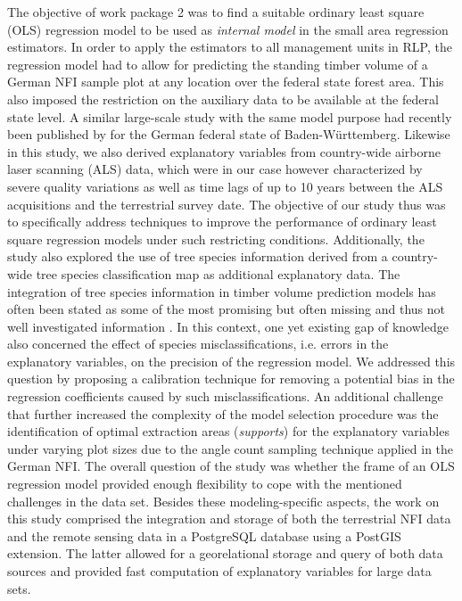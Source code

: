 The objective of work package 2 was to find a suitable ordinary least square (OLS) regression model to be used as \textit{internal model} in the small area regression estimators. In order to apply the estimators to all management units in RLP, the regression model had to allow for predicting the standing timber volume of a German NFI sample plot at any location over the federal state forest area. This also imposed the restriction on the auxiliary data to be available at the federal state level. A similar large-scale study with the same model purpose had recently been published by \citet{maack2016} for the German federal state of Baden-W{\"u}rttemberg. Likewise in this study, we also derived explanatory variables from country-wide airborne laser scanning (ALS) data, which were in our case however characterized by severe quality variations as well as time lags of up to 10 years between the ALS acquisitions and the terrestrial survey date. The objective of our study thus was to specifically address techniques to improve the performance of ordinary least square regression models under such restricting conditions. Additionally, the study also explored the use of tree species information derived from a country-wide tree species classification map as additional explanatory data. The integration of tree species information in timber volume prediction models has often been stated as some of the most promising but often missing and thus not well investigated information \citep{koch2010, white2016}. In this context, one yet existing gap of knowledge also concerned the effect of species misclassifications, i.e. errors in the explanatory variables, on the precision of the regression model. We addressed this question by proposing a calibration technique for removing a potential bias in the regression coefficients caused by such misclassifications. An additional challenge that further increased the complexity of the model selection procedure was the identification of optimal extraction areas (\textit{supports}) for the explanatory variables under varying plot sizes due to the angle count sampling technique applied in the German NFI. The overall question of the study was whether the frame of an OLS regression model provided enough flexibility to cope with the mentioned challenges in the data set. Besides these modeling-specific aspects, the work on this study comprised the integration and storage of both the terrestrial NFI data and the remote sensing data in a PostgreSQL database using a PostGIS extension. The latter allowed for a georelational storage and query of both data sources and provided fast computation of explanatory variables for large data sets.

